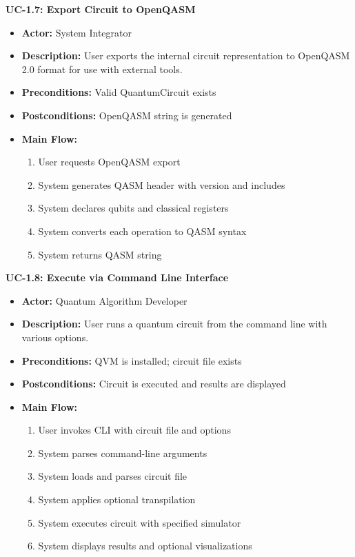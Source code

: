 \textbf{UC-1.7: Export Circuit to OpenQASM}
\begin{itemize}
\item \textbf{Actor:} System Integrator
\item \textbf{Description:} User exports the internal circuit representation to OpenQASM 2.0 format for use with external tools.
\item \textbf{Preconditions:} Valid QuantumCircuit exists
\item \textbf{Postconditions:} OpenQASM string is generated
\item \textbf{Main Flow:}
\begin{enumerate}
\item User requests OpenQASM export
\item System generates QASM header with version and includes
\item System declares qubits and classical registers
\item System converts each operation to QASM syntax
\item System returns QASM string
\end{enumerate}
\end{itemize}

\textbf{UC-1.8: Execute via Command Line Interface}
\begin{itemize}
\item \textbf{Actor:} Quantum Algorithm Developer
\item \textbf{Description:} User runs a quantum circuit from the command line with various options.
\item \textbf{Preconditions:} QVM is installed; circuit file exists
\item \textbf{Postconditions:} Circuit is executed and results are displayed
\item \textbf{Main Flow:}
\begin{enumerate}
\item User invokes CLI with circuit file and options
\item System parses command-line arguments
\item System loads and parses circuit file
\item System applies optional transpilation
\item System executes circuit with specified simulator
\item System displays results and optional visualizations
\end{enumerate}
\end{itemize}

